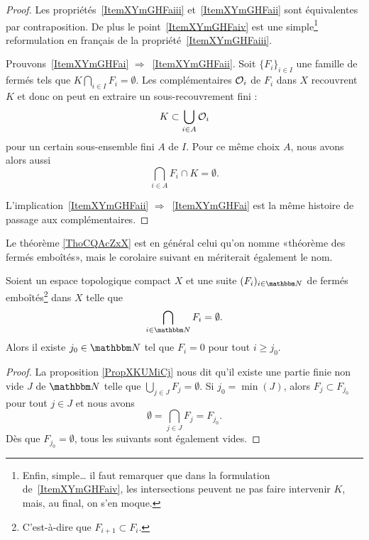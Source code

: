 \begin{proof}
    Les propriétés~\ref{ItemXYmGHFaiii} et~\ref{ItemXYmGHFaii} sont équivalentes par contraposition. De plus le point~\ref{ItemXYmGHFaiv} est une simple\footnote{Enfin, simple\dots{} il faut remarquer que dans la formulation de~\ref{ItemXYmGHFaiv}, les intersections peuvent ne pas faire intervenir \( K \), mais, au final, on s'en moque.} reformulation en français de la propriété~\ref{ItemXYmGHFaiii}.

    Prouvons~\ref{ItemXYmGHFai} \( \Rightarrow\)~\ref{ItemXYmGHFaii}. Soit \( \{ F_i \}_{i\in I}\) une famille de fermés tels que \( K\bigcap_{i\in I}F_i=\emptyset\). Les complémentaires \( \mathcal{O}_i\) de \( F_i\) dans \( X\) recouvrent \( K\) et donc on peut en extraire un sous-recouvrement fini :
    \begin{equation}
        K\subset\bigcup_{i\in A}\mathcal{O}_i
    \end{equation}
    pour un certain sous-ensemble fini \( A\) de \( I\). Pour ce même choix \( A\), nous avons alors aussi
    \begin{equation}
        \bigcap_{i\in A}F_i \cap K =\emptyset.
    \end{equation}

    L'implication~\ref{ItemXYmGHFaii} \( \Rightarrow\)~\ref{ItemXYmGHFai} est la même histoire de passage aux complémentaires.
\end{proof}

Le théorème \ref{ThoCQAcZxX} est en général celui qu'on nomme «théorème des fermés emboîtés», mais le corolaire suivant en mériterait également le nom.
\begin{corollary}       \label{CORooQABLooMPSUBf}
    Soient un espace topologique compact \( X\) et une suite \( (F_i)_{i\in \eN}\) de fermés emboîtés\footnote{C'est-à-dire que \( F_{i+1}\subset F_i\).} dans \( X\) telle que
    \begin{equation}
        \bigcap_{i\in \eN}F_i=\emptyset.
    \end{equation}
    Alors il existe \( j_0\in \eN\) tel que \( F_i=0\) pour tout \( i\geq j_0\).
\end{corollary}

\begin{proof}
    La proposition \ref{PropXKUMiCj} nous dit qu'il existe une partie finie non vide \( J\) de \( \eN\) telle que \( \bigcup_{j\in J}F_j=\emptyset\). Si \( j_0=\min(J)\), alors \( F_j\subset F_{j_0}\) pour tout \( j\in J\) et nous avons
    \begin{equation}
        \emptyset=\bigcap_{j\in J}F_j=F_{j_0}.
    \end{equation}
    Dès que \( F_{j_0}=\emptyset\), tous les suivants sont également vides.
\end{proof}

